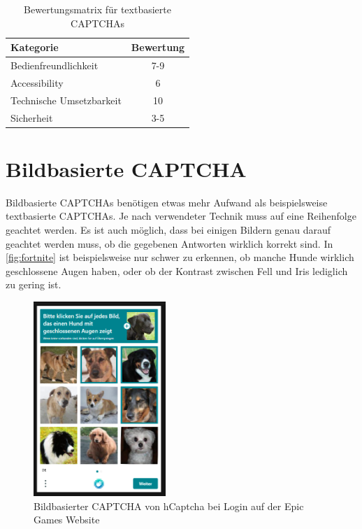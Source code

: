 \begin{table}[h!]
    \caption{Bewertungsmatrix für textbasierte CAPTCHAs}
    \begin{center}
        \begin{tabular}{l|c}
            Kategorie                       & Bewertung \\\hline
            Bedienfreundlichkeit            & 7-9         \\
            Accessibility                   & 6        \\
            Technische Umsetzbarkeit        & 10         \\
            Sicherheit                      & 3-5         
        \end{tabular}
    \end{center}
    \label{table:matrix:text}
\end{table}

\section{Bildbasierte CAPTCHA}
Bildbasierte CAPTCHAs benötigen etwas mehr Aufwand als beispielsweise textbasierte CAPTCHAs.
Je nach verwendeter Technik muss auf eine Reihenfolge geachtet werden. 
Es ist auch möglich, dass bei einigen Bildern genau darauf geachtet werden muss, ob die gegebenen Antworten wirklich korrekt sind.
In \autoref{fig:fortnite} ist beispielsweise nur schwer zu erkennen, ob manche Hunde wirklich geschlossene Augen haben, 
oder ob der Kontrast zwischen Fell und Iris lediglich zu gering ist.

\begin{figure}[h!]
    \centering\includegraphics[width=5cm]{gfx/mygraphics/fuerfortnite.png}
 \caption{Bildbasierter CAPTCHA von hCaptcha bei Login auf der Epic Games Website}
      \label{fig:fortnite}
\end{figure}

